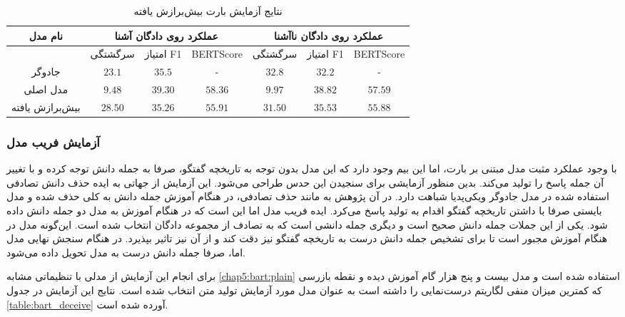 \begin{table}[h]
	\caption{نتایج آزمایش بارت بیش‌برازش یافته}
	\label{table:bart_overfit}
	\begin{tabular}{|c|c|c|c|c|c|c|}
		\hline
		نام مدل         & \multicolumn{3}{c|}{عملکرد روی دادگان آشنا}           & \multicolumn{3}{c|}{عملکرد روی دادگان نا‌آشنا}        \\ \hline
		& سرگشتگی         & امتیاز F1        & BERTScore        & سرگشتگی         & امتیاز F1        & BERTScore        \\ \hline
		جادوگر          & $23.1$          & $35.5$           & -                & $32.8$          & $32.2$           & -                \\ \hline
		مدل اصلی        & $\mathbf{9.48}$ & $\mathbf{39.30}$ & $\mathbf{58.36}$ & $\mathbf{9.97}$ & $\mathbf{38.82}$ & $\mathbf{57.59}$ \\ \hline
		بیش‌برازش یافته & $28.50$         & $35.26$          & $55.91$          & $31.50$         & $35.53$          & $55.88$          \\ \hline
	\end{tabular}
\end{table}


\subsubsection{آزمایش فریب مدل}
با وجود عملکرد مثبت مدل مبتنی بر بارت، اما این بیم وجود دارد که این مدل بدون توجه به تاریخچه گفتگو، صرفا به جمله دانش توجه کرده و با تغییر آن جمله پاسخ را تولید می‌کند. بدین منظور آزمایشی برای سنجیدن این حدس طراحی می‌شود. این آزمایش از جهاتی به ایده حذف دانش تصادفی استفاده شده در مدل جادوگر ویکی‌پدیا شباهت دارد. در آن پژوهش به مانند حذف تصادفی، در هنگام آموزش جمله دانش به کلی حذف شده و مدل بایستی صرفا با داشتن تاریخچه گفتگو اقدام به تولید پاسخ می‌کرد. ایده فریب مدل اما این است که در هنگام آموزش به مدل دو جمله دانش داده شود. یکی از این جملات جمله دانش صحیح است و دیگری جمله دانشی است که به تصادف از مجموعه دادگان انتخاب شده است. این‌گونه مدل در هنگام آموزش مجبور است تا برای تشخیص جمله دانش درست به تاریخچه گفتگو نیز دقت کند و از آن نیز تاثیر بپذیرد. در هنگام سنجش نهایی مدل اما، صرفا جمله دانش درست به مدل تحویل داده می‌شود. 

برای انجام این آزمایش از مدلی با تنظیماتی مشابه 
\ref{chap5:bart:plain}
استفاده شده است و مدل بیست و پنج هزار گام آموزش دیده و نقطه بازرسی که کمترین میزان منفی لگاریتم درست‌نمایی را داشته است به عنوان مدل مورد آزمایش تولید متن انتخاب شده است. نتایج این آزمایش در جدول 
\ref{table:bart_deceive}
آورده شده است.

